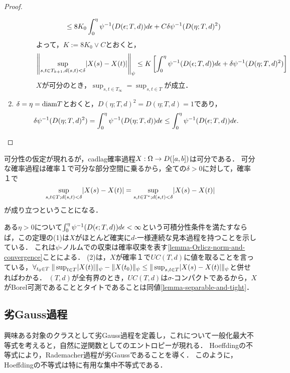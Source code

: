 \documentclass[uplatex,dvipdfmx]{jsreport}
\begin{document}
\begin{proof}
\begin{enumerate}
\begin{description}
\begin{align*}
                &\le 8K_0\int^\eta_0\psi^{-1}(D(\epsilon;T,d))d\epsilon+C\delta\psi^{-1}(D(\eta;T,d)^2)
            \end{align*}
            よって，$K:=8K_0\lor C$とおくと，
            \[\left\|\sup_{s,t\in T_{k+1},d(s,t)<\delta}\lvert X(s)-X(t)\rvert\right\|_\psi\le K\left[\int^\eta_0\psi^{-1}(D(\epsilon;T,d))d\epsilon+\delta\psi^{-1}(D(\eta;T,d)^2)\right]\]
            $X$が可分のとき，$\sup_{s,t\in T_\infty}=\sup_{s,t\in T}$が成立．
        \end{description}
        \item $\delta=\eta=\mathrm{diam} T$とおくと，$D(\eta;T,d)^2=D(\eta;T,d)=1$であり，
        \[\delta\psi^{-1}(D(\eta;T,d)^2)=\int^\eta_0\psi^{-1}(D(\eta;T,d))d\epsilon\le\int^\eta_0\psi^{-1}(D(\epsilon;T,d))d\epsilon.\]
    \end{enumerate}
\end{proof}
\begin{remarks}[可分確率過程]
    可分性の仮定が現れるが，cadlag確率過程$X:\Omega\to D([a,b])$は可分である．
    可分な確率過程は確率１で可分な部分空間に乗るから，全ての$\delta>0$に対して，確率１で
    \[\sup_{s,t\in T;d(s,t)<\delta}\lvert X(s)-X(t)\rvert=\sup_{s,t\in T^*;d(s,t)<\delta}\lvert X(s)-X(t)\rvert\]
    が成り立つということになる．

    ある$\eta>0$について$\int^\eta_0\psi^{-1}(D(\epsilon;T,d))d\epsilon<\infty$という可積分性条件を満たすならば，この定理の(1)は$X$がほとんど確実に$d$-一様連続な見本過程を持つことを示している．
    これは$\psi$-ノルムでの収束は確率収束を表す\ref{lemma-Orlicz-norm-and-convergence}ことによる．
    (2)は，$X$が確率１で$UC(T,d)$に値を取ることを言っている，$\forall_{t_0\in T}\;\|\sup_{t\in T}\lvert X(t)\rvert\|_\psi-\|X(t_0)\|_\psi\le\|\sup_{s,t\in T}\lvert X(s)-X(t)\rvert\|_\psi$と併せればわかる．
    $(T,d)$が全有界のとき，$UC(T,d)$は$\sigma$-コンパクトであるから，$X$がBorel可測であることとタイトであることは同値\ref{lemma-separable-and-tight}．
\end{remarks}


\subsection{劣Gauss過程}

\begin{tcolorbox}[colframe=ForestGreen, colback=ForestGreen!10!white,breakable,colbacktitle=ForestGreen!40!white,coltitle=black,fonttitle=\bfseries\sffamily,
title=]
    興味ある対象のクラスとして劣Gauss過程を定義し，これについて一般化最大不等式を考えると，自然に逆関数としてのエントロピーが現れる．
    Hoeffdingの不等式により，Rademacher過程が劣Gaussであることを導く．
    このように，Hoeffdingの不等式は特に有用な集中不等式である．
\end{tcolorbox}
\end{document}
